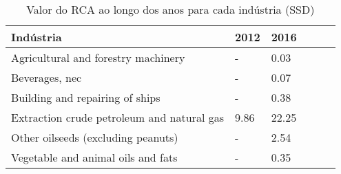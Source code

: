 \begin{table}
\centering
\caption{Valor do RCA ao longo dos anos para cada indústria (SSD)}
\begin{tabular}{p{6cm}p{1.5cm}p{1.5cm}p{1.5cm}p{1.5cm}p{1.5cm}}
\toprule
                                 Indústria & 2012 &  2016 \\
\midrule
       Agricultural and forestry machinery &    - &  0.03 \\
                            Beverages, nec &    - &  0.07 \\
           Building and repairing of ships &    - &  0.38 \\
Extraction crude petroleum and natural gas & 9.86 & 22.25 \\
        Other oilseeds (excluding peanuts) &    - &  2.54 \\
        Vegetable and animal oils and fats &    - &  0.35 \\
\bottomrule
\end{tabular}
\end{table}
